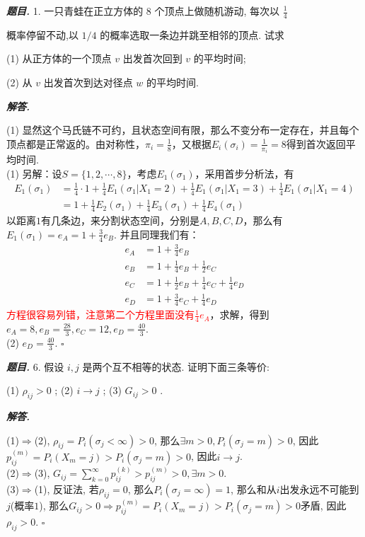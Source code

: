 \documentclass[10pt, a4paper, oneside]{ctexart}
\newenvironment{problem}{\begin{framed}\par\noindent\textbf{\textit{题目. }}}{\end{framed}\par}
\newenvironment{solution}{%
  \par\noindent\textbf{\textit{解答. }}\ignorespaces
}{%
  \hfill\ensuremath{\square}\par %
}
\begin{document}
    \begin{problem}
        1. 一只青蛙在正立方体的 8 个顶点上做随机游动, 每次以 $\frac{1}{4}$
    
    概率停留不动,以 \( 1/4 \) 的概率选取一条边并跳至相邻的顶点. 试求
    
    (1) 从正方体的一个顶点 \( v \) 出发首次回到 \( v \) 的平均时间;
    
    (2) 从 \( v \) 出发首次到达对径点 \( w \) 的平均时间.
    \end{problem}
    \begin{solution}
        (1) 显然这个马氏链不可约，且状态空间有限，那么不变分布一定存在，并且每个顶点都是正常返的。由对称性，$\pi_i=\frac{1}{8}$，又根据$E_i(\sigma_i)=\frac{1}{\pi_i}=8$得到首次返回平均时间.\\
        (1) 另解：设$S=\{1,2,\cdots,8\}$，考虑$E_1(\sigma_1)$，采用首步分析法，有
        \begin{align*}
            E_1(\sigma_1)&=\frac{1}{4}\cdot 1+\frac{1}{4} E_1(\sigma_1|X_1=2)+\frac{1}{4} E_1(\sigma_1|X_1=3)+\frac{1}{4} E_1(\sigma_1|X_1=4)\\
            &=1+\frac{1}{4}E_2(\sigma_1)+\frac{1}{4}E_3(\sigma_1)+\frac{1}{4}E_4(\sigma_1)
        \end{align*}
        以距离$1$有几条边，来分割状态空间，分别是$A,B,C,D$，那么有$E_{1}(\sigma_1)=e_A=1+\frac{3}{4}e_B$. 并且同理我们有：
        \begin{align*}
            e_A&=1+\frac{3}{4}e_B\\e_B&=1+\frac{1}{4}e_B+\frac{1}{2}e_C\\e_C&=1+\frac{1}{2}e_B+\frac{1}{4}e_C+\frac{1}{4}e_D\\e_D&=1+\frac{3}{4}e_C+\frac{1}{4}e_D
        \end{align*}
        \textcolor{red}{方程很容易列错，注意第二个方程里面没有$\frac{1}{4}e_A$}，求解，得到$e_A=8,e_B=\frac{28}{3},e_C=12,e_D=\frac{40}{3}$.\\(2) $e_D=\frac{40}{3}$.
    \end{solution}

    \begin{problem}
        6. 假设 \( i,j \) 是两个互不相等的状态. 证明下面三条等价:
       
       (1) \( {\rho }_{ij} > 0 \) ; (2) \( i \rightarrow  j \) ; (3) \( {G}_{ij} > 0 \) .
       \end{problem}
       
       \begin{solution}
           (1)$\Rightarrow$(2), $\rho_{ij}=P_i(\sigma_j<\infty)>0$, 那么$\exists m>0, P_i(\sigma_j=m)>0$, 因此$p_{ij}^{(m)}=P_i(X_m=j)>P_i(\sigma_j=m)>0$, 因此$i\to j$.\\
           (2)$\Rightarrow$(3), $G_{ij}=\sum_{k=0}^{\infty}p_{ij}^{(k)}>p_{ij}^{(m)}>0,\exists m>0$.\\
           (3)$\Rightarrow$(1), 反证法, 若$\rho_{ij}=0$, 那么$P_i(\sigma_j=\infty)=1$, 那么和从$i$出发永远不可能到$j$(概率$1$), 那么$G_{ij}>0\Rightarrow p_{ij}^{(m)}=P_i(X_m=j)>P_i(\sigma_j=m)>0$矛盾, 因此$\rho_{ij}>0$.
       \end{solution}
       
\end{document}

